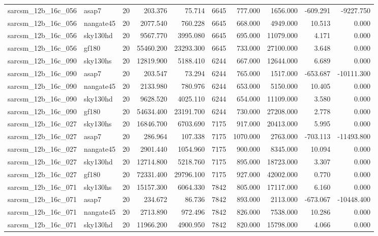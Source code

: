 \begin{tabular}{llrrrrrrrr}
sarcsm\_12b\_16c\_056 & asap7 & 20 & 203.376 & 75.714 & 6645 & 777.000 & 1656.000 & -609.291 & -9227.750 \\
sarcsm\_12b\_16c\_056 & nangate45 & 20 & 2077.540 & 760.228 & 6645 & 668.000 & 4949.000 & 10.513 & 0.000 \\
sarcsm\_12b\_16c\_056 & sky130hd & 20 & 9567.770 & 3995.080 & 6645 & 695.000 & 11079.000 & 4.171 & 0.000 \\
sarcsm\_12b\_16c\_056 & gf180 & 20 & 55460.200 & 23293.300 & 6645 & 733.000 & 27100.000 & 3.648 & 0.000 \\
sarcsm\_12b\_16c\_090 & sky130hs & 20 & 12819.900 & 5188.410 & 6244 & 667.000 & 12644.000 & 6.689 & 0.000 \\
sarcsm\_12b\_16c\_090 & asap7 & 20 & 203.547 & 73.294 & 6244 & 765.000 & 1517.000 & -653.687 & -10111.300 \\
sarcsm\_12b\_16c\_090 & nangate45 & 20 & 2133.980 & 780.976 & 6244 & 653.000 & 5150.000 & 10.405 & 0.000 \\
sarcsm\_12b\_16c\_090 & sky130hd & 20 & 9628.520 & 4025.110 & 6244 & 654.000 & 11109.000 & 3.580 & 0.000 \\
sarcsm\_12b\_16c\_090 & gf180 & 20 & 54634.400 & 23191.700 & 6244 & 730.000 & 27208.000 & 2.778 & 0.000 \\
sarcsm\_12b\_16c\_027 & sky130hs & 20 & 16846.700 & 6703.690 & 7175 & 917.000 & 20413.000 & 5.995 & 0.000 \\
sarcsm\_12b\_16c\_027 & asap7 & 20 & 286.964 & 107.338 & 7175 & 1070.000 & 2763.000 & -703.113 & -11493.800 \\
sarcsm\_12b\_16c\_027 & nangate45 & 20 & 2901.440 & 1054.960 & 7175 & 900.000 & 8345.000 & 10.094 & 0.000 \\
sarcsm\_12b\_16c\_027 & sky130hd & 20 & 12714.800 & 5218.760 & 7175 & 895.000 & 18723.000 & 3.307 & 0.000 \\
sarcsm\_12b\_16c\_027 & gf180 & 20 & 72331.400 & 29796.100 & 7175 & 927.000 & 42002.000 & 0.770 & 0.000 \\
sarcsm\_12b\_16c\_071 & sky130hs & 20 & 15157.300 & 6064.330 & 7842 & 805.000 & 17117.000 & 6.160 & 0.000 \\
sarcsm\_12b\_16c\_071 & asap7 & 20 & 234.672 & 86.736 & 7842 & 893.000 & 2113.000 & -673.067 & -10448.400 \\
sarcsm\_12b\_16c\_071 & nangate45 & 20 & 2713.890 & 972.496 & 7842 & 826.000 & 7538.000 & 10.286 & 0.000 \\
sarcsm\_12b\_16c\_071 & sky130hd & 20 & 11966.200 & 4900.950 & 7842 & 820.000 & 15798.000 & 4.066 & 0.000 \\

\end{tabular}
